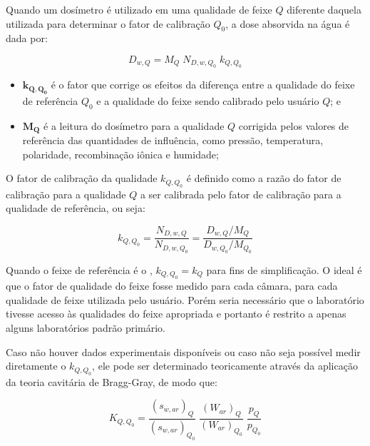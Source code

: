 \documentclass[11pt,a4paper]{article}
\newcounter{exemplo}
\begin{document}
	Quando um dosímetro é utilizado em uma qualidade de feixe $Q$ diferente daquela utilizada para determinar o fator de calibração $Q_0$, a dose absorvida na água é dada por:

		\begin{equation}
			D_{w,Q} = M_Q \; N_{D,w,Q_0} \; k_{Q,Q_0}
			\label{eq:doseAguaCorrigidaQualidade}
		\end{equation}

		\begin{exemplo}[onde:]
			\begin{itemize}[label=\textcolor{CarnationPink}{$\star$}]
				\item \textbf{\textcolor{CarnationPink}{$\mathbf{k_{Q,Q_0}}$}} é o fator que corrige os efeitos da diferença entre a qualidade do feixe de referência $Q_0$ e a qualidade do feixe sendo calibrado pelo usuário $Q$; e
				\item \textbf{\textcolor{CarnationPink}{$\mathbf{M_Q}$}} é a leitura do dosímetro para a qualidade $Q$ corrigida pelos valores de referência das quantidades de influência, como pressão, temperatura, polaridade, recombinação iônica e humidade;
			\end{itemize}
		\end{exemplo}

		O fator de calibração da qualidade $k_{Q,Q_0}$ é definido como a razão do fator de calibração para a qualidade $Q$ a ser calibrada pelo fator de calibração para a qualidade de referência, ou seja:

			\begin{equation}
				k_{Q,Q_0} = \frac{N_{D,w,Q}}{N_{D,w,Q_0}} = \frac{D_{w,Q}/M_Q}{D_{w,Q_0}/M_{Q_0}}
			\end{equation}

		Quando o feixe de referência é o , $k_{Q,Q_0} = k_Q$ para fins de simplificação.  O ideal é que o fator de qualidade do feixe fosse medido para cada câmara, para cada qualidade de feixe utilizada pelo usuário. Porém seria necessário que o laboratório tivesse acesso às qualidades do feixe apropriada e portanto é restrito a apenas alguns laboratórios padrão primário.

		Caso não houver dados experimentais disponíveis ou caso não seja possível medir diretamente o $k_{Q,Q_0}$, ele pode ser determinado teoricamente através da aplicação da teoria cavitária de Bragg-Gray, de modo que:

			\begin{equation}
				K_{Q,Q_0} = \frac{(s_{w,ar})_Q}{(s_{w,ar})_{Q_0}} \; \frac{(W_{ar})_{Q}}{(W_{ar})_{Q_0}} \; \frac{p_{Q}}{p_{Q_0}}
				\label{eq:kqqBraggGray}
			\end{equation}
\end{document}
